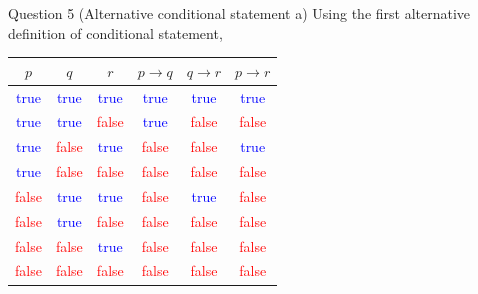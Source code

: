 \documentclass[10pt]{beamer}
\begin{document}
\begin{frame}[fragile]{Question 5 (Alternative conditional statement a)}
Using the first alternative definition of conditional statement,
\begin{table}
\centering
\begin{tabular}{|c|c|c|c|c|c|} 
\hline
$p$                     & $q$                     & $r$                     & $p \rightarrow q$       & $q \rightarrow r$       & $p \rightarrow r$        \\ 
\hline
\textcolor{blue}{true}  & \textcolor{blue}{true}  & \textcolor{blue}{true}  & \textcolor{blue}{true}  & \textcolor{blue}{true}  & \textcolor{blue}{true}   \\ 
\hline
\textcolor{blue}{true}  & \textcolor{blue}{true}  & \textcolor{red}{false}  & \textcolor{blue}{true}  & \textcolor{red}{false}  & \textcolor{red}{false}   \\ 
\hline
\textcolor{blue}{true}  & \textcolor{red}{false}  & \textcolor{blue}{true}  & \textcolor{red}{false}  & \textcolor{red}{false}  & \textcolor{blue}{true}   \\ 
\hline
\textcolor{blue}{true}  & \textcolor{red}{false}  & \textcolor{red}{false}  & \textcolor{red}{false}  & \textcolor{red}{false}  & \textcolor{red}{false}   \\ 
\hline
\textcolor{red}{false}  & \textcolor{blue}{true}  & \textcolor{blue}{true}  & \textcolor{red}{false}  & \textcolor{blue}{true}  & \textcolor{red}{false}   \\ 
\hline
\textcolor{red}{false}  & \textcolor{blue}{true}  & \textcolor{red}{false}  & \textcolor{red}{false}  & \textcolor{red}{false}  & \textcolor{red}{false}   \\ 
\hline
\textcolor{red}{false}  & \textcolor{red}{false}  & \textcolor{blue}{true}  & \textcolor{red}{false}  & \textcolor{red}{false}  & \textcolor{red}{false}   \\ 
\hline
\textcolor{red}{false}  & \textcolor{red}{false}  & \textcolor{red}{false}  & \textcolor{red}{false}  & \textcolor{red}{false}  & \textcolor{red}{false}   \\
\hline
\end{tabular}
\end{table}
\end{frame}
\end{document}

